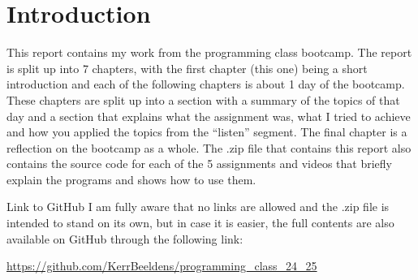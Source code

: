 \chapter{Introduction}
This report contains my work from the programming class bootcamp. The report is split up into 7 chapters, with the first chapter (this one) being a short introduction and each of the following chapters is about 1 day of the bootcamp. These chapters are split up into a section with a summary of the topics of that day and a section that explains what the assignment was, what I tried to achieve and how you applied the topics from the ``listen'' segment. The final chapter is a reflection on the bootcamp as a whole. The .zip file that contains this report also contains the source code for each of the 5 assignments and videos that briefly explain the programs and shows how to use them.

\medskip

\begin{hyperlinkbox}{Link to GitHub}
    I am fully aware that no links are allowed and the .zip file is intended to stand on its own, but in case it is easier, the full contents are also available on GitHub through the following link:

    \medskip

    \href{https://github.com/KerrBeeldens/programming_class_24_25}{https://github.com/KerrBeeldens/programming\_class\_24\_25}
\end{hyperlinkbox}
